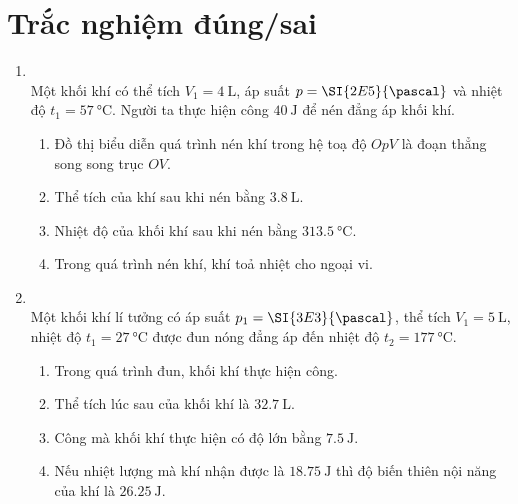 \section{Trắc nghiệm đúng/sai}
\begin{enumerate}[label=\bfseries Câu \arabic*:, leftmargin=1.7cm]
	\item{}\\
	Một khối khí có thể tích $V_1=\SI{4}{\liter}$, áp suất $p=\SI{2E5}{\pascal}$ và nhiệt độ $t_1=\SI{57}{\celsius}$. Người ta thực hiện công $\SI{40}{\joule}$ để nén đẳng áp khối khí.
	\begin{enumerate}[label=\alph*)]
		\item Đồ thị biểu diễn quá trình nén khí trong hệ toạ độ $OpV$ là đoạn thẳng song song trục $OV$.
		\item Thể tích của khí sau khi nén bằng $\SI{3.8}{\liter}$.
		\item Nhiệt độ của khối khí sau khi nén bằng $\SI{313.5}{\celsius}$.
		\item Trong quá trình nén khí, khí toả nhiệt cho ngoại vi.
	\end{enumerate}


\item {}\\
Một khối khí lí tưởng có áp suất $p_1=\SI{3E3}{\pascal}$, thể tích $V_1=\SI{5}{\liter}$, nhiệt độ $t_1=\SI{27}{\celsius}$ được đun nóng đẳng áp đến nhiệt độ $t_2=\SI{177}{\celsius}$.
\begin{enumerate}[label=\alph*)]
	\item Trong quá trình đun, khối khí thực hiện công.
	\item Thể tích lúc sau của khối khí là $\SI{32.7}{\liter}$.
	\item Công mà khối khí thực hiện có độ lớn bằng $\SI{7.5}{\joule}$.
	\item Nếu nhiệt lượng mà khí nhận được là $\SI{18.75}{\joule}$ thì độ biến thiên nội năng của khí là $\SI{26.25}{\joule}$. 
\end{enumerate}


\end{enumerate}
